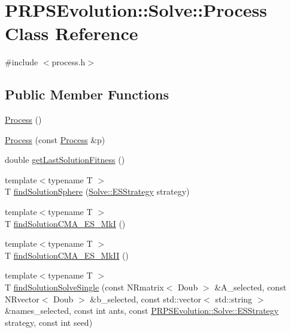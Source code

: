 \hypertarget{class_p_r_p_s_evolution_1_1_solve_1_1_process}{\section{\-P\-R\-P\-S\-Evolution\-:\-:\-Solve\-:\-:\-Process \-Class \-Reference}
\label{class_p_r_p_s_evolution_1_1_solve_1_1_process}
}


{\ttfamily \#include $<$process.\-h$>$}

\subsection*{\-Public \-Member \-Functions}
\begin{DoxyCompactItemize}
\item 
\hyperlink{class_p_r_p_s_evolution_1_1_solve_1_1_process_a9b7073851d90e13d0604a39b7b2e87a1}{\-Process} ()
\item 
\hyperlink{class_p_r_p_s_evolution_1_1_solve_1_1_process_a5474f974eef2e2045a91d00bff5c61a5}{\-Process} (const \hyperlink{class_p_r_p_s_evolution_1_1_solve_1_1_process}{\-Process} \&p)
\item 
double \hyperlink{class_p_r_p_s_evolution_1_1_solve_1_1_process_abaa98d7246af85e8ccbede1fcdf70006}{get\-Last\-Solution\-Fitness} ()
\item 
{\footnotesize template$<$typename T $>$ }\\\-T \hyperlink{class_p_r_p_s_evolution_1_1_solve_1_1_process_a15a1cab78ef84a79c1109e26d3219925}{find\-Solution\-Sphere} (\hyperlink{namespace_p_r_p_s_evolution_1_1_solve_abab6c89dae9caa790d8f2bcb1ef45685}{\-Solve\-::\-E\-S\-Strategy} strategy)
\item 
{\footnotesize template$<$typename T $>$ }\\\-T \hyperlink{class_p_r_p_s_evolution_1_1_solve_1_1_process_a9ceac0490f2754b754ad3b9208db396d}{find\-Solution\-C\-M\-A\-\_\-\-E\-S\-\_\-\-Mk\-I} ()
\item 
{\footnotesize template$<$typename T $>$ }\\\-T \hyperlink{class_p_r_p_s_evolution_1_1_solve_1_1_process_a6561dd707c4c8234202138fac1d3f60b}{find\-Solution\-C\-M\-A\-\_\-\-E\-S\-\_\-\-Mk\-I\-I} ()
\item 
{\footnotesize template$<$typename T $>$ }\\\-T \hyperlink{class_p_r_p_s_evolution_1_1_solve_1_1_process_a84516d63684783e520e760c13095cf18}{find\-Solution\-Solve\-Single} (const \-N\-Rmatrix$<$ \-Doub $>$ \&\-A\-\_\-selected, const \-N\-Rvector$<$ \-Doub $>$ \&b\-\_\-selected, const std\-::vector$<$ std\-::string $>$ \&names\-\_\-selected, const int ants, const \hyperlink{namespace_p_r_p_s_evolution_1_1_solve_abab6c89dae9caa790d8f2bcb1ef45685}{\-P\-R\-P\-S\-Evolution\-::\-Solve\-::\-E\-S\-Strategy} strategy, const int seed)

\end{DoxyCompactItemize}
